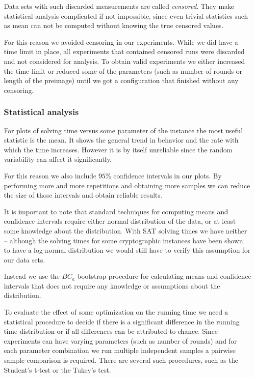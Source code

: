 Data sets with such discarded measurements are called \emph{censored}.
They make statistical analysis complicated if not impossible, since even trivial statistics such as mean can not be computed without knowing the true censored values.

For this reason we avoided censoring in our experiments.
While we did have a time limit in place, all experiments that contained censored runs were discarded and not considered for analysis.
To obtain valid experiments we either increased the time limit or reduced some of the parameters (such as number of rounds or length of the preimage) until we got a configuration that finished without any censoring.

\subsubsection{Statistical analysis}
For plots of solving time versus some parameter of the instance the most useful statistic is the mean.
It shows the general trend in behavior and the rate with which the time increases.
However it is by itself unreliable since the random variability can affect it significantly.

For this reason we also include $95\%$ confidence intervals in our plots.
By performing more and more repetitions and obtaining more samples we can reduce the size of those intervals and obtain reliable results.

It is important to note that standard techniques for computing means and confidence intervals require either normal distribution of the data, or at least some knowledge about the distribution.
With SAT solving times we have neither -- although the solving times for some cryptographic instances have been shown \cite{bard2007efficient} to have a log-normal distribution we would still have to verify this assumption for our data sets.

Instead we use the $BC_a$ bootstrap procedure \cite{diciccio1996bootstrap} for calculating means and confidence intervals that does not require any knowledge or assumptions about the distribution.

To evaluate the effect of some optimization on the running time we need a statistical procedure to decide if there is a significant difference in the running time distribution or if all differences can be attributed to chance.
Since experiments can have varying parameters (such as number of rounds) and for each parameter combination we run multiple independent samples a pairwise sample comparison is required.
There are several such procedures, such as the Student's t-test or the Tukey's test.

